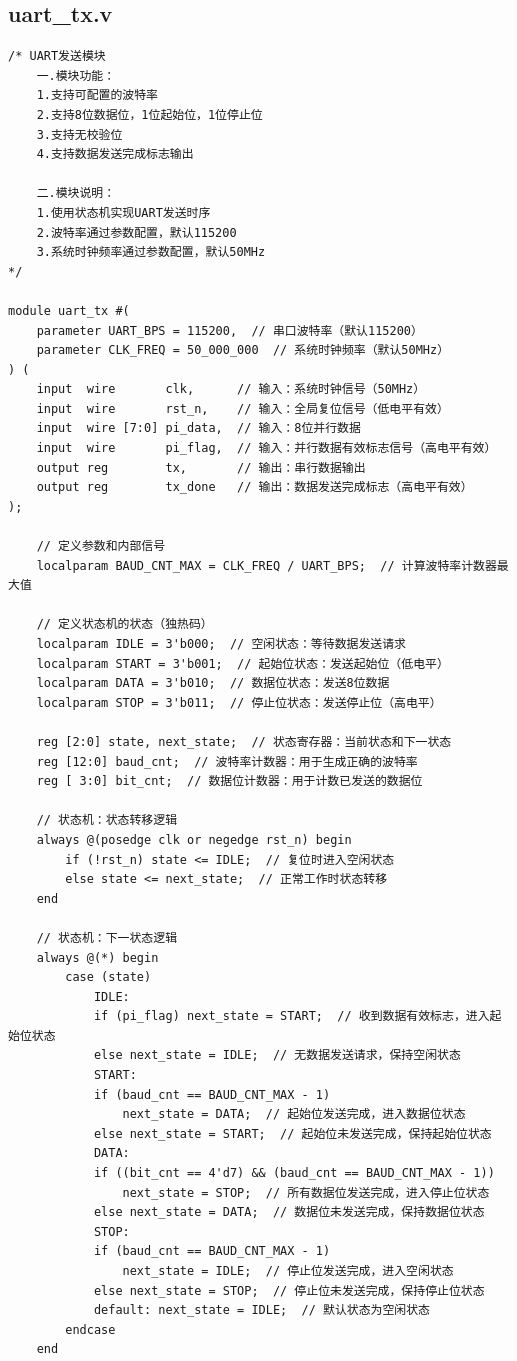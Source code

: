 \documentclass[a4paper,10pt]{article}
\begin{document}
\subsection{uart_tx.v}
\begin{lstlisting}[caption=uart_tx.v]
/* UART发送模块
    一.模块功能：
    1.支持可配置的波特率
    2.支持8位数据位，1位起始位，1位停止位
    3.支持无校验位
    4.支持数据发送完成标志输出

    二.模块说明：
    1.使用状态机实现UART发送时序
    2.波特率通过参数配置，默认115200
    3.系统时钟频率通过参数配置，默认50MHz
*/

module uart_tx #(
    parameter UART_BPS = 115200,  // 串口波特率（默认115200）
    parameter CLK_FREQ = 50_000_000  // 系统时钟频率（默认50MHz）
) (
    input  wire       clk,      // 输入：系统时钟信号（50MHz）
    input  wire       rst_n,    // 输入：全局复位信号（低电平有效）
    input  wire [7:0] pi_data,  // 输入：8位并行数据
    input  wire       pi_flag,  // 输入：并行数据有效标志信号（高电平有效）
    output reg        tx,       // 输出：串行数据输出
    output reg        tx_done   // 输出：数据发送完成标志（高电平有效）
);

    // 定义参数和内部信号
    localparam BAUD_CNT_MAX = CLK_FREQ / UART_BPS;  // 计算波特率计数器最大值

    // 定义状态机的状态（独热码）
    localparam IDLE = 3'b000;  // 空闲状态：等待数据发送请求
    localparam START = 3'b001;  // 起始位状态：发送起始位（低电平）
    localparam DATA = 3'b010;  // 数据位状态：发送8位数据
    localparam STOP = 3'b011;  // 停止位状态：发送停止位（高电平）

    reg [2:0] state, next_state;  // 状态寄存器：当前状态和下一状态
    reg [12:0] baud_cnt;  // 波特率计数器：用于生成正确的波特率
    reg [ 3:0] bit_cnt;  // 数据位计数器：用于计数已发送的数据位

    // 状态机：状态转移逻辑
    always @(posedge clk or negedge rst_n) begin
        if (!rst_n) state <= IDLE;  // 复位时进入空闲状态
        else state <= next_state;  // 正常工作时状态转移
    end

    // 状态机：下一状态逻辑
    always @(*) begin
        case (state)
            IDLE:
            if (pi_flag) next_state = START;  // 收到数据有效标志，进入起始位状态
            else next_state = IDLE;  // 无数据发送请求，保持空闲状态
            START:
            if (baud_cnt == BAUD_CNT_MAX - 1)
                next_state = DATA;  // 起始位发送完成，进入数据位状态
            else next_state = START;  // 起始位未发送完成，保持起始位状态
            DATA:
            if ((bit_cnt == 4'd7) && (baud_cnt == BAUD_CNT_MAX - 1))
                next_state = STOP;  // 所有数据位发送完成，进入停止位状态
            else next_state = DATA;  // 数据位未发送完成，保持数据位状态
            STOP:
            if (baud_cnt == BAUD_CNT_MAX - 1)
                next_state = IDLE;  // 停止位发送完成，进入空闲状态
            else next_state = STOP;  // 停止位未发送完成，保持停止位状态
            default: next_state = IDLE;  // 默认状态为空闲状态
        endcase
    end


\end{lstlisting}
\end{document}
